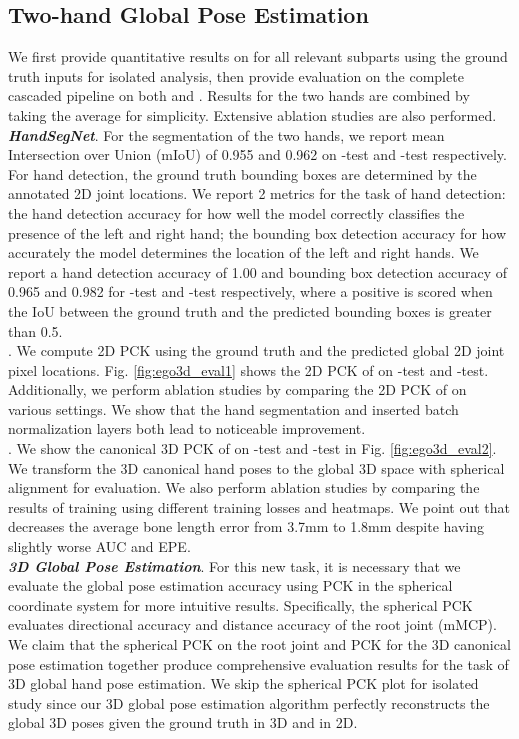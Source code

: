 \documentclass[10pt,twocolumn,letterpaper]{article}
\begin{document}
\subsection{Two-hand Global Pose Estimation}\label{sec:experiments_glob}
\indent We first provide quantitative results on  for all relevant subparts using the ground truth inputs for isolated analysis, then provide evaluation on the complete cascaded pipeline on both  and . Results for the two hands are combined by taking the average for simplicity. Extensive ablation studies are also performed.\\
\textbf{\textit{HandSegNet}}. For the segmentation of the two hands, we report mean Intersection over Union (mIoU) of 0.955 and 0.962 on -test and -test respectively. For hand detection, the ground truth bounding boxes are determined by the annotated 2D joint locations. We report 2 metrics for the task of hand detection: the hand detection accuracy for how well the model correctly classifies the presence of the left and right hand; the bounding box detection accuracy for how accurately the model determines the location of the left and right hands. We report a hand detection accuracy of 1.00 and bounding box detection accuracy of 0.965 and 0.982 for -test and -test respectively, where a positive is scored when the IoU between the ground truth and the predicted bounding boxes is greater than 0.5.\\
. We compute 2D PCK using the ground truth and the predicted global 2D joint pixel locations. Fig. \ref{fig:ego3d_eval1} shows the 2D PCK of \textit{} on -test and -test. Additionally, we perform ablation studies by comparing the 2D PCK of \textit{} on various settings. We show that the hand segmentation and inserted batch normalization layers both lead to noticeable improvement.\\
. We show the canonical 3D PCK of \textit{} on -test and -test in Fig. \ref{fig:ego3d_eval2}. We transform the 3D canonical hand poses to the global 3D space with spherical alignment for evaluation. We also perform ablation studies by comparing the results of training using different training losses and heatmaps. We point out that  decreases the average bone length error from 3.7mm to 1.8mm despite having slightly worse AUC and EPE.\\
\textbf{\textit{3D Global Pose Estimation}}. For this new task, it is necessary that we evaluate the global pose estimation accuracy using PCK in the spherical coordinate system for more intuitive results. Specifically, the spherical PCK evaluates directional accuracy and distance accuracy of the root joint (mMCP). We claim that the spherical PCK on the root joint and PCK for the 3D canonical pose estimation together produce comprehensive evaluation results for the task of 3D global hand pose estimation. We skip the spherical PCK plot for isolated study since our 3D global pose estimation algorithm perfectly reconstructs the global 3D poses given the ground truth  in 3D and  in 2D.\\
\end{document}
